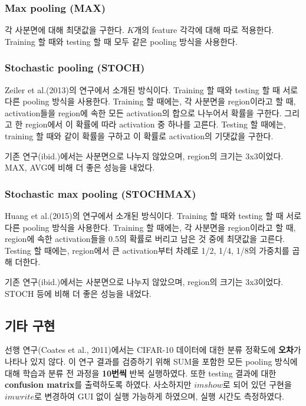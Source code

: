 \documentclass[a4paper,9pt]{article}
\begin{document}
\begin{multicols*}{2}
\subsubsection{Max pooling (MAX)}

각 사분면에 대해 최댓값을 구한다.
$K$개의 feature 각각에 대해 따로 적용한다.
Training 할 때와 testing 할 때 모두 같은 pooling 방식을 사용한다.

\subsubsection{Stochastic pooling (STOCH)}

Zeiler et al.(2013)의 연구에서 소개된 방식이다.
Training 할 때와 testing 할 때 서로 다른 pooling 방식을 사용한다.
Training 할 때에는, 각 사분면을 region이라고 할 때, activation들을 region에 속한 모든 activation의 합으로 나누어서 확률을 구한다.
그리고 한 region에서 이 확률에 따라 activation 중 하나를 고른다.
Testing 할 때에는, training 할 때와 같이 확률을 구하고 이 확률로 activation의 기댓값을 구한다.

기존 연구(ibid.)에서는 사분면으로 나누지 않았으며, region의 크기는 3x3이었다. MAX, AVG에 비해 더 좋은 성능을 내었다.

\subsubsection{Stochastic max pooling (STOCHMAX)}

Huang et al.(2015)의 연구에서 소개된 방식이다.
Training 할 때와 testing 할 때 서로 다른 pooling 방식을 사용한다.
Training 할 때에는, 각 사분면을 region이라고 할 때, region에 속한 activation들을 0.5의 확률로 버리고 남은 것 중에 최댓값을 고른다.
Testing 할 때에는, region에서 큰 activation부터 차례로 1/2, 1/4, 1/8의 가중치를 곱해 더한다.

기존 연구(ibid.)에서는 사분면으로 나누지 않았으며, region의 크기는 3x3이었다. STOCH 등에 비해 더 좋은 성능을 내었다.

\subsection{기타 구현}

선행 연구(Coates et al., 2011)에서는 CIFAR-10 데이터에 대한 분류 정확도에 \textbf{오차}가 나타나 있지 않다.
이 연구 결과를 검증하기 위해 SUM을 포함한 모든 pooling 방식에 대해 학습과 분류 전 과정을 \textbf{10번씩} 반복 실행하였다.
또한 testing 결과에 대한 \textbf{confusion matrix}를 출력하도록 하였다.
사소하지만 $imshow$로 되어 있던 구현을 $imwrite$로 변경하여 GUI 없이 실행 가능하게 하였으며, 실행 시간도 측정하였다.


\end{multicols*}
\end{document}
